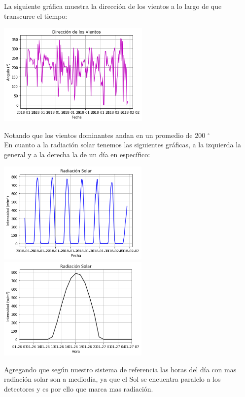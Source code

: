\documentclass[12pt]{article}
\begin{document}
La siguiente gráfica muestra la dirección de los vientos a lo largo de que transcurre el tiempo:
\begin{center}
	\includegraphics[height=5cm]{output_16_0.png}
\end{center}
Notando que los vientos dominantes andan en un promedio de 200 $^\circ$\\

En cuanto a la radiación solar tenemos las siguientes gráficas, a la izquierda la general y a la derecha la de un día en específico:
\begin{center}
	\includegraphics[height=5cm]{output_17_0.png}
    \includegraphics[height=5cm]{output_18_0.png}
\end{center}
Agregando que según nuestro sistema de referencia las horas del día con mas radiación solar son a mediodía, ya que el Sol se encuentra paralelo a los detectores y es por ello que marca mas radiación.\\
\end{document}
